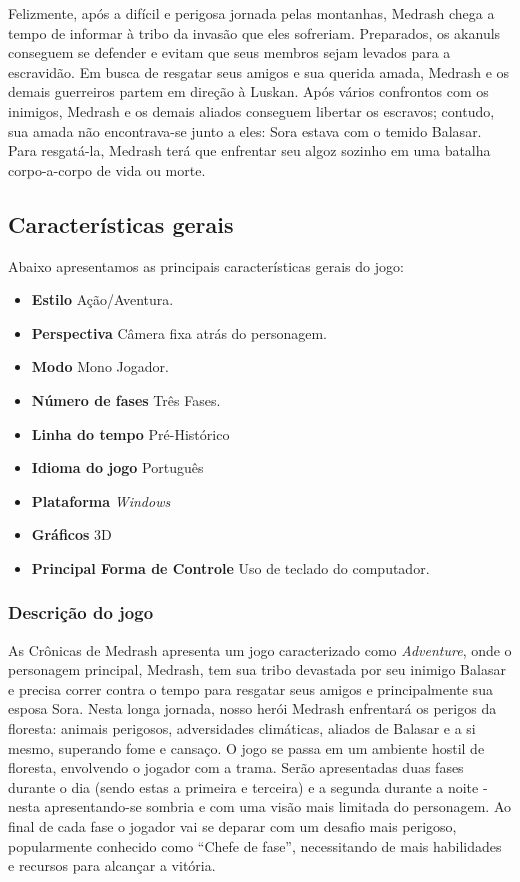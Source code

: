 Felizmente, após a difícil e perigosa jornada pelas montanhas, Medrash 
chega a tempo de informar à tribo da invasão que eles sofreriam. Preparados,
 os akanuls conseguem se defender e evitam que seus membros sejam levados
 para a escravidão. Em busca de resgatar seus amigos e sua querida amada, 
Medrash e os demais guerreiros partem em direção à Luskan. Após vários
 confrontos com os inimigos, Medrash e os demais aliados 
conseguem libertar os escravos; contudo, sua amada não encontrava-se junto 
a eles: Sora estava com o temido Balasar. Para resgatá-la, Medrash terá que
 enfrentar seu algoz sozinho em uma batalha corpo-a-corpo de vida ou morte.

\subsection{Características gerais}
Abaixo apresentamos as principais características gerais do jogo:
\begin{itemize}
\item {\bf Estilo}
Ação/Aventura. 
\item{\bf Perspectiva}
Câmera fixa atrás do personagem.
\item{\bf Modo}
Mono Jogador.
\item{\bf Número de fases}
Três Fases.
\item{ \bf Linha do tempo}
Pré-Histórico 
\item{ \bf Idioma do jogo}
Português
\item{ \bf Plataforma}
\textit{Windows}
\item{\bf Gráficos}
3D
\item{ \bf Principal Forma de Controle}
Uso de teclado do computador.
\end{itemize}

\subsubsection{Descrição do jogo}
As Crônicas de Medrash apresenta um jogo caracterizado como \textit{Adventure},
 onde o personagem principal, Medrash, tem sua tribo devastada por seu inimigo 
Balasar e precisa correr contra o tempo para resgatar seus amigos e 
principalmente sua esposa Sora.
Nesta longa jornada, nosso herói Medrash enfrentará os perigos da floresta: 
animais perigosos, adversidades climáticas, aliados de Balasar e a si mesmo, 
superando fome e cansaço.
O jogo se passa em um ambiente hostil de floresta, envolvendo o jogador com a 
trama. Serão apresentadas duas fases durante o dia (sendo estas a primeira e terceira)
 e a segunda durante a noite - nesta apresentando-se sombria e com uma visão 
mais limitada do personagem. Ao final de cada fase o jogador vai se deparar com 
um desafio mais perigoso, popularmente conhecido como ``Chefe de fase'', necessitando 
de mais habilidades e recursos para alcançar a vitória.

